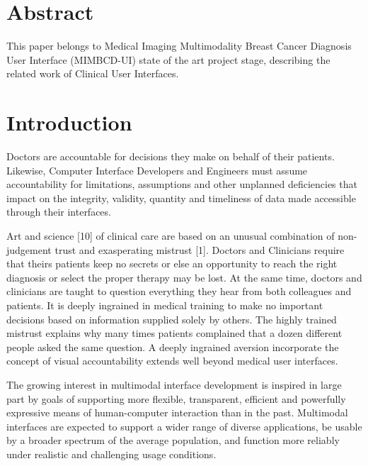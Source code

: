 \begin{titlepage}

\vfill %

\end{titlepage}

\section{Abstract}

This paper belongs to Medical Imaging Multimodality Breast Cancer Diagnosis User Interface (MIMBCD-UI) state of the art project stage, describing the related work of Clinical User Interfaces.

\section{Introduction}

Doctors are accountable for decisions they make on behalf of their patients. Likewise, Computer Interface Developers and Engineers must assume accountability for limitations, assumptions and other unplanned deficiencies that impact on the integrity, validity, quantity and timeliness of data made accessible through their interfaces.

Art and science [10] of clinical care are based on an unusual combination of non-judgement trust and exasperating mistrust [1]. Doctors and Clinicians require that theirs patients keep no secrets or else an opportunity to reach the right diagnosis or select the proper therapy may be lost. At the same time, doctors and clinicians are taught to question everything they hear from both colleagues and patients. It is deeply ingrained in medical training to make no important decisions based on information supplied solely by others. The highly trained mistrust explains why many times patients complained that a dozen different people asked the same question. A deeply ingrained aversion incorporate the concept of visual accountability extends well beyond medical user interfaces.

The growing interest in multimodal interface development is inspired in large part by goals of supporting more flexible, transparent, efficient and powerfully expressive means of human-computer interaction than in the past. Multimodal interfaces are expected to support a wider range of diverse applications, be usable by a broader spectrum of the average population, and function more reliably under realistic and challenging usage conditions.

